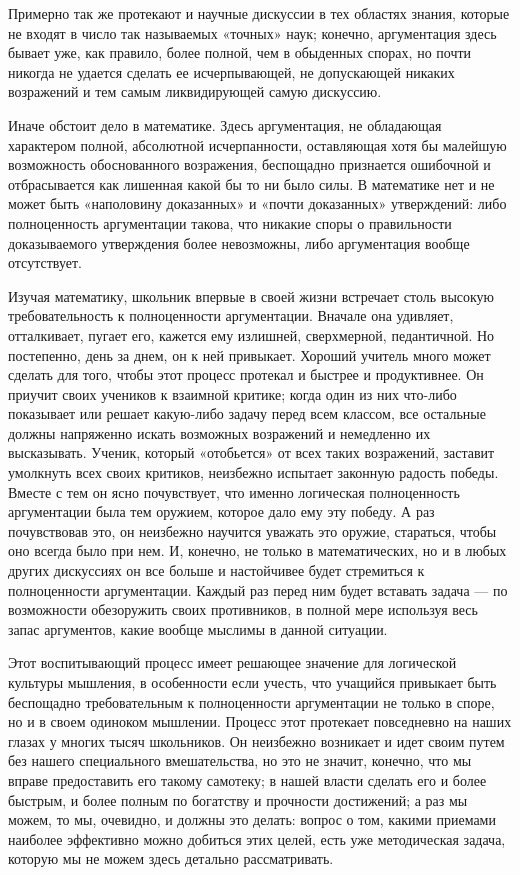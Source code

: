 \documentclass[12pt, a4paper, openany]{book}
\begin{document}
Примерно так же протекают и научные дискуссии в тех областях знания, которые не входят в число так  называемых «точных» наук; конечно, аргументация здесь бывает уже, как правило, более полной, чем в обыденных спорах, но почти никогда не удается сделать ее  исчерпывающей, не допускающей никаких возражений и тем  самым ликвидирующей самую дискуссию. 

Иначе обстоит дело в математике. Здесь аргументация, не обладающая характером полной, абсолютной  исчерпанности, оставляющая хотя бы малейшую возможность обоснованного возражения, беспощадно признается  ошибочной и отбрасывается как лишенная какой бы то ни было силы. В математике нет и не может быть  «наполовину доказанных» и «почти доказанных» утверждений: либо полноценность аргументации такова, что никакие споры о правильности доказываемого утверждения более невозможны, либо аргументация вообще отсутствует. 

Изучая математику, школьник впервые в своей жизни встречает столь высокую требовательность к полноценности аргументации. Вначале она удивляет, отталкивает, пугает его, кажется ему излишней, сверхмерной, педантичной. Но постепенно, день за днем, он к ней привыкает.  Хороший учитель много может сделать для того, чтобы этот процесс протекал и быстрее и продуктивнее. Он приучит своих учеников к взаимной критике; когда один из них что-либо показывает или решает какую-либо задачу перед всем классом, все остальные должны напряженно искать возможных возражений и немедленно их высказывать. Ученик, который «отобьется» от всех таких возражений, заставит умолкнуть всех своих критиков, неизбежно  испытает законную радость победы. Вместе с тем он ясно почувствует, что именно логическая полноценность  аргументации была тем оружием, которое дало ему эту победу. А раз почувствовав это, он неизбежно научится уважать это оружие, стараться, чтобы оно всегда было при нем. И, конечно, не только в математических, но и в любых других дискуссиях он все больше и настойчивее будет стремиться к полноценности аргументации. Каждый раз перед ним будет вставать задача — по возможности  обезоружить своих противников, в полной мере используя весь запас аргументов, какие вообще мыслимы в данной ситуации. 

Этот воспитывающий процесс имеет решающее значение для логической культуры мышления, в особенности если учесть, что учащийся привыкает быть беспощадно  требовательным к полноценности аргументации не только в споре, но и в своем одиноком мышлении. Процесс этот протекает повседневно на наших глазах у многих тысяч школьников. Он неизбежно возникает и идет своим путем без нашего специального вмешательства, но это не значит, конечно, что мы вправе предоставить его такому самотеку; в нашей власти сделать его и более быстрым, и более полным по богатству и прочности достижений; а раз мы можем, то мы, очевидно, и должны это делать: вопрос о том, какими  приемами наиболее эффективно можно добиться этих целей, есть уже методическая задача, которую мы не можем здесь детально рассматривать. 
\end{document}
